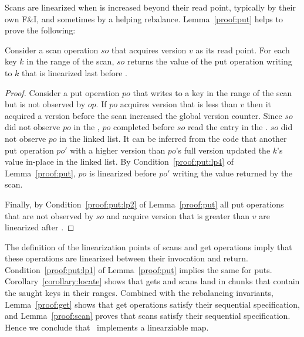 Scans are linearized when  is increased beyond their read point, typically by their own F\&I, and sometimes by a helping rebalance. 
Lemma~\ref{proof:put} helps to prove the following:
\begin{lemma}
\label{proof:scan}
Consider a scan operation $so$ that acquires version $v$ as its read point. For each key $k$ in the range of the scan, $so$ returns the value of the put operation writing to $k$ that is linearized last before .
\end{lemma}
\begin{proof}

Consider a put operation $po$ that writes to a key in the range of the scan but is not observed by $op$. If $po$ acquires version that is less than $v$ then it acquired a version before the scan increased the global version counter. Since $so$ did not observe $po$ in the , $po$ completed before $so$ read the entry in the . $so$ did not observe $po$ in the linked list. It can be inferred from the code that another put operation $po'$ with a higher version than $po$'s full version updated the $k$'s value in-place in the linked list.
By Condition~\ref{proof:put:lp4} of Lemma~\ref{proof:put}, $po$ is linearized before $po'$ writing the value returned by the scan.

Finally, by Condition~\ref{proof:put:lp2} of Lemma~\ref{proof:put} all put operations that are not observed by $so$ and acquire version that is greater than $v$ are linearized after .
\end{proof}

The definition of the linearization points of scans and get operations imply that these operations are linearized between their invocation and return.
Condition~\ref{proof:put:lp1} of Lemma~\ref{proof:put} implies the same for puts. 
Corollary~\ref{corollary:locate} shows that gets and scans land in chunks that contain the saught keys in their ranges. Combined with the rebalancing invariants,
Lemma~\ref{proof:get} shows that get operations satisfy their sequential specification, and Lemma~\ref{proof:scan} proves that scans satisfy their sequential specification. 
Hence we conclude that \kiwi\ implements a linearziable map. 
